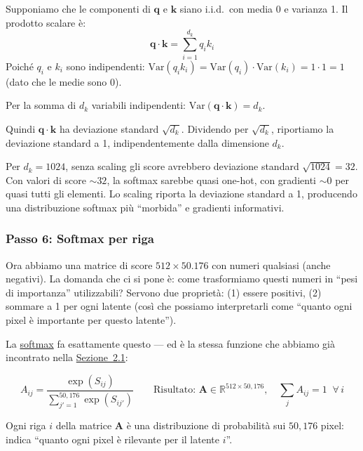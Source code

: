 \documentclass[12pt,a4paper]{article}
\begin{document}
\begin{proofbox}[title={Perch\'e $\sqrt{d_k}$ e non un altro valore?}]
Supponiamo che le componenti di $\mathbf{q}$ e $\mathbf{k}$ siano i.i.d.\ con media 0 e varianza 1. Il prodotto scalare \`e:
\[
    \mathbf{q} \cdot \mathbf{k} = \sum_{i=1}^{d_k} q_i k_i
\]
Poich\'e $q_i$ e $k_i$ sono indipendenti: $\text{Var}(q_i k_i) = \text{Var}(q_i) \cdot \text{Var}(k_i) = 1 \cdot 1 = 1$ (dato che le medie sono 0).

Per la somma di $d_k$ variabili indipendenti: $\text{Var}(\mathbf{q} \cdot \mathbf{k}) = d_k$.

Quindi $\mathbf{q} \cdot \mathbf{k}$ ha deviazione standard $\sqrt{d_k}$. Dividendo per $\sqrt{d_k}$, riportiamo la deviazione standard a 1, indipendentemente dalla dimensione $d_k$.

Per $d_k = 1024$, senza scaling gli score avrebbero deviazione standard $\sqrt{1024} = 32$. Con valori di score $\sim 32$, la softmax sarebbe quasi one-hot, con gradienti $\sim 0$ per quasi tutti gli elementi. Lo scaling riporta la deviazione standard a 1, producendo una distribuzione softmax pi\`u ``morbida'' e gradienti informativi.
\end{proofbox}

\subsubsection{Passo 6: Softmax per riga} \label{sec:softmax_ca}

Ora abbiamo una matrice di score $512 \times 50.176$ con numeri qualsiasi (anche negativi). La domanda che ci si pone \`e: come trasformiamo questi numeri in ``pesi di importanza'' utilizzabili? Servono due propriet\`a: (1) essere positivi, (2) sommare a 1 per ogni latente (cos\`i che possiamo interpretarli come ``quanto ogni pixel \`e importante per questo latente'').

La \hyperref[sec:softmax]{softmax} fa esattamente questo --- ed \`e la stessa funzione che abbiamo gi\`a incontrato nella \hyperref[sec:softmax]{Sezione~2.1}:

\[
    A_{ij} = \frac{\exp(S_{ij})}{\sum_{j'=1}^{50{,}176} \exp(S_{ij'})} \qquad \text{Risultato: } \mathbf{A} \in \mathbb{R}^{512 \times 50{,}176}, \quad \sum_j A_{ij} = 1 \;\;\forall\, i
\]

Ogni riga $i$ della matrice $\mathbf{A}$ \`e una distribuzione di probabilit\`a sui $50{,}176$ pixel: indica ``quanto ogni pixel \`e rilevante per il latente $i$''.
\end{document}
